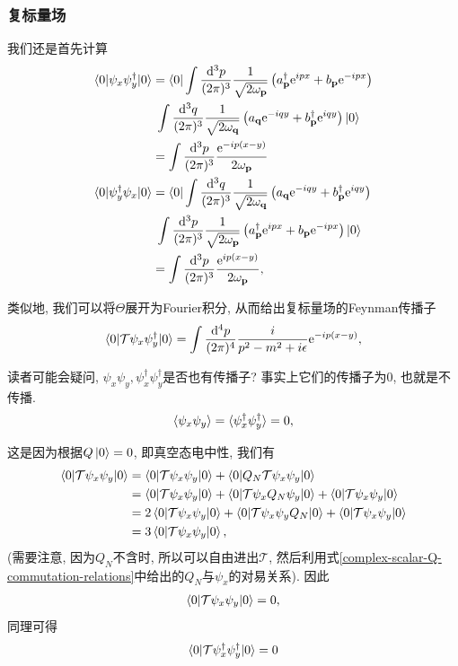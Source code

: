 \subsubsection{复标量场}
我们还是首先计算
\begin{align}
    \braket{0|\psi_x\psi_y^\dagger|0}&=\bra0\int\ldsq p\left(\a p^\dagger\exp{ipx}+\b p\exp{-ipx}\right)\notag\\
    &\;\int\ldsq q\left(\a q\exp{-iqy}+\b p^\dagger\exp{iqy}\right)\ket0\\
    &=\int\ld p[\exp{-ip(x-y)}]\\
    \braket{0|\psi_y^\dagger\psi_x|0}&=\bra0\int\ldsq q\left(\a q\exp{-iqy}+\b p^\dagger\exp{iqy}\right)\notag\\
    &\;\int\ldsq p\left(\a p^\dagger\exp{ipx}+\b p\exp{-ipx}\right)\ket0\\
    &=\int\ld p[\exp{ip(x-y)}],
\end{align}

类似地, 我们可以将$\Theta$展开为Fourier积分, 从而给出复标量场的Feynman传播子
\begin{align}
    \braket{0|\mathcal T\psi_x\psi_y^\dagger|0}=\int\frac{\mathrm d^4p}{(2\pi)^4}\frac i{p^2-m^2+i\epsilon}\mathrm e^{-ip(x-y)},
\end{align}

读者可能会疑问, $\psi_x\psi_y, \psi_x^\dagger\psi_y^\dagger$是否也有传播子? 事实上它们的传播子为$0$, 也就是不传播.
\begin{align}
    \braket{\psi_x\psi_y}=\braket{\psi_x^\dagger\psi_y^\dagger}=0,
\end{align}

这是因为根据$Q\ket0=0$, 即真空态电中性, 我们有
\begin{align}
    \braket{0|\mathcal T\psi_x\psi_y|0}&=\braket{0|\mathcal T\psi_x\psi_y|0}+\braket{0|Q_N\mathcal T\psi_x\psi_y|0}\\
    &=\braket{0|\mathcal T\psi_x\psi_y|0}+\braket{0|\mathcal T\psi_xQ_N\psi_y|0}+\braket{0|\mathcal T\psi_x\psi_y|0}\\
    &=2\braket{0|\mathcal T\psi_x\psi_y|0}+\braket{0|\mathcal T\psi_x\psi_yQ_N|0}+\braket{0|\mathcal T\psi_x\psi_y|0}\\
    &=3\braket{0|\mathcal T\psi_x\psi_y|0},
\end{align}
(需要注意, 因为$Q_N$不含时, 所以可以自由进出$\mathcal T$, 然后利用式\eqref{complex-scalar-Q-commutation-relations}中给出的$Q_N$与$\psi_x$的对易关系). 因此
\begin{align}
    \braket{0|\mathcal T\psi_x\psi_y|0}=0,
\end{align}
同理可得
\begin{align}
    \braket{0|\mathcal T\psi_x^\dagger\psi_y^\dagger|0}=0
\end{align}

